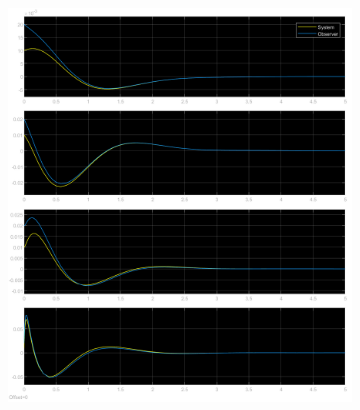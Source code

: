 \documentclass[class=article, crop=false]{standalone}
\begin{document}
\begin{resolution}
\begin{figure}[H]
\begin{subfigure}[b]{0.475\textwidth}
            \caption{}
        \end{subfigure}
        \begin{subfigure}[b]{0.475\textwidth}
            \centering
            \includegraphics[width=\textwidth]{../images/simulink_scope5_0_01_02.png}
            \caption{}
        \end{subfigure}
        \caption{}
    \end{figure}
\end{resolution}
\end{document}
